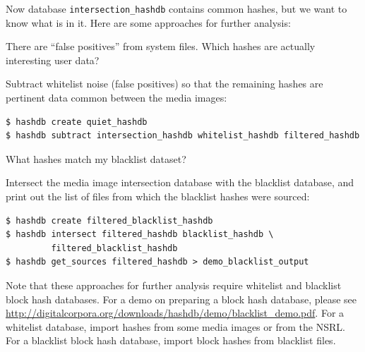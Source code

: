 \documentclass[12pt,twoside]{article}
\begin{document}
Now database \texttt{intersection\_hashdb} contains common hashes,
but we want to know what is in it.
Here are some approaches for further analysis:
\begin{compactitem}
\item There are ``false positives'' from system files.
Which hashes are actually interesting user data?

Subtract whitelist noise (false positives)
so that the remaining hashes are pertinent data common between the
media images:
\begin{verbatim}
$ hashdb create quiet_hashdb
$ hashdb subtract intersection_hashdb whitelist_hashdb filtered_hashdb
\end{verbatim}

\item What hashes match my blacklist dataset?

Intersect the media image intersection database with the blacklist database,
and print out the list of files from which the blacklist hashes were sourced:
\begin{verbatim}
$ hashdb create filtered_blacklist_hashdb
$ hashdb intersect filtered_hashdb blacklist_hashdb \
         filtered_blacklist_hashdb
$ hashdb get_sources filtered_hashdb > demo_blacklist_output
\end{verbatim}
\end{compactitem}

Note that these approaches for further analysis require whitelist and blacklist
block hash databases.
For a demo on preparing a block hash database, please see
\url{http://digitalcorpora.org/downloads/hashdb/demo/blacklist\_demo.pdf}.
For a whitelist database, import hashes from some media images
or from the NSRL.
For a blacklist block hash database, import block hashes from blacklist files.
\end{document}
